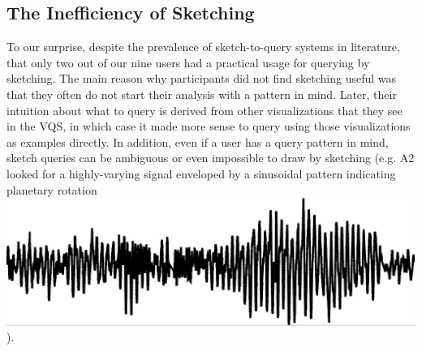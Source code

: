 \subsection{The Inefficiency of Sketching}
\par To our surprise, despite the prevalence of sketch-to-query systems in literature,  that only two out of our nine users had a practical usage for querying by sketching. %
The main reason why participants did not find sketching useful was that they often do not start their analysis with a pattern in mind. Later, their intuition about what to query is derived from other visualizations that they see in the VQS, in which case it made more sense to query using those visualizations as examples directly. In addition, even if a user has a query pattern in mind, sketch queries can be ambiguous or even impossible to draw by sketching (e.g. A2 looked for a highly-varying signal enveloped by a sinusoidal pattern indicating planetary rotation \includegraphics[width=2\baselineskip,keepaspectratio]{figures/impossible_sketch.png}).
